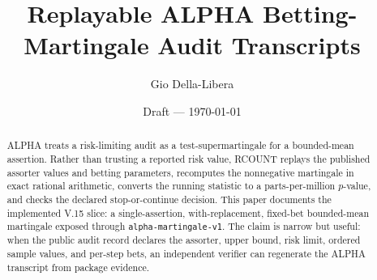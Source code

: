 \documentclass[12pt]{article}
\title{Replayable ALPHA Betting-Martingale Audit Transcripts}
\author{Gio Della-Libera}
\date{Draft --- \today}
\begin{document}
\maketitle

\begin{abstract}
ALPHA treats a risk-limiting audit as a test-supermartingale for a bounded-mean
assertion. Rather than trusting a reported risk value, RCOUNT replays the
published assorter values and betting parameters, recomputes the nonnegative
martingale in exact rational arithmetic, converts the running statistic to a
parts-per-million $p$-value, and checks the declared stop-or-continue decision.
This paper documents the implemented V.15 slice: a single-assertion,
with-replacement, fixed-bet bounded-mean martingale exposed through
\texttt{alpha-martingale-v1}. The claim is narrow but useful: when the public
audit record declares the assorter, upper bound, risk limit, ordered sample
values, and per-step bets, an independent verifier can regenerate the ALPHA
transcript from package evidence.
\end{abstract}








\nocite{rcount-overview-2026,stark-alpha-2022}


\end{document}
